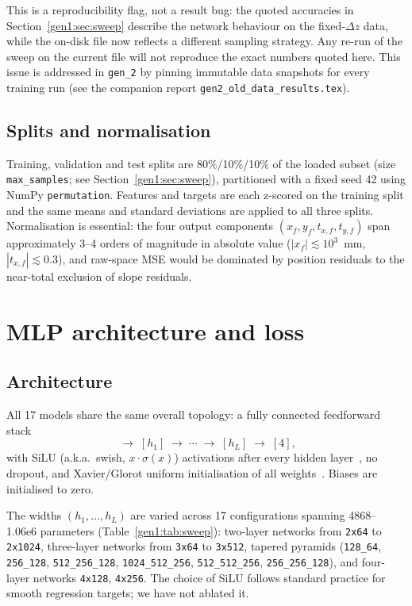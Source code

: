 \documentclass[a4paper,11pt]{article}
\newcommand{\num}[1]{#1}
\newcommand{\dz}{\Delta z}
\begin{document}
This is a reproducibility flag, not a result bug: the quoted accuracies in
Section~\ref{gen1:sec:sweep} describe the network behaviour on the
fixed-$\dz$ data, while the on-disk file now reflects a different sampling
strategy. Any re-run of the sweep on the current file will not reproduce
the exact numbers quoted here. This issue is addressed in \texttt{gen\_2}
by pinning immutable data snapshots for every training run (see the
companion report \texttt{gen2\_old\_data\_results.tex}).

\subsection{Splits and normalisation}

Training, validation and test splits are 80\%/10\%/10\% of the loaded
subset (size \texttt{max\_samples}; see Section~\ref{gen1:sec:sweep}),
partitioned with a fixed seed 42 using NumPy \texttt{permutation}.
Features and targets are each z-scored on the training split and the
same means and standard deviations are applied to all three splits.
Normalisation is essential: the four output components
$(x_f, y_f, t_{x,f}, t_{y,f})$ span approximately 3--4 orders of
magnitude in absolute value
($|x_f|\lesssim 10^{3}$~mm, $|t_{x,f}|\lesssim 0.3$), and raw-space MSE
would be dominated by position residuals to the near-total exclusion of
slope residuals.

\section{MLP architecture and loss}\label{gen1:sec:mlp}

\subsection{Architecture}

All 17 models share the same overall topology: a fully connected
feedforward stack
\begin{equation}
[6] \;\to\; [h_1] \;\to\; \cdots \;\to\; [h_L] \;\to\; [4],
\end{equation}
with SiLU (a.k.a.\ swish, $x\cdot\sigma(x)$) activations after every
hidden layer~\cite{Elfwing2018}, no dropout, and Xavier/Glorot uniform
initialisation of all weights~\cite{GlorotBengio2010}. Biases are
initialised to zero.

The widths $(h_1,\ldots,h_L)$ are varied across 17 configurations spanning
\num{4868}--\num{1.06e6} parameters (Table~\ref{gen1:tab:sweep}): two-layer
networks from \texttt{2x64} to \texttt{2x1024}, three-layer networks from
\texttt{3x64} to \texttt{3x512}, tapered pyramids
(\texttt{128\_64}, \texttt{256\_128}, \texttt{512\_256\_128},
\texttt{1024\_512\_256}, \texttt{512\_512\_256}, \texttt{256\_256\_128}),
and four-layer networks \texttt{4x128}, \texttt{4x256}. The choice of
SiLU follows standard practice for smooth regression targets; we have
not ablated it.
\end{document}

